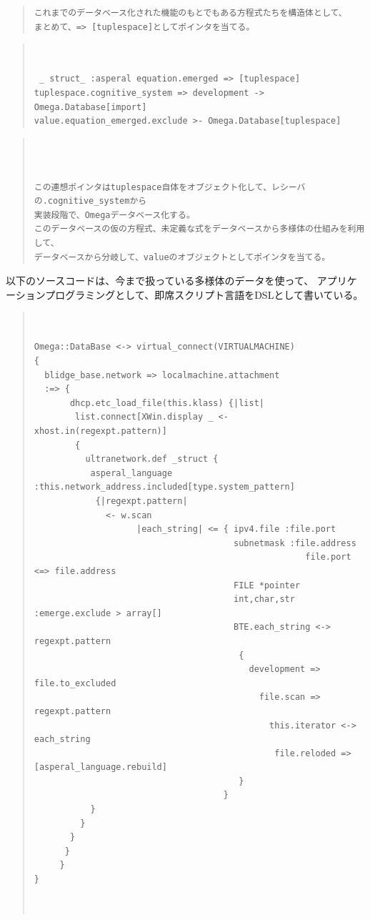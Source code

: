 \documentclass{jsarticle}
\begin{document}
{\begin{quote}
\begin{verbatim}
これまでのデータベース化された機能のもとでもある方程式たちを構造体として、
まとめて、=> [tuplespace]としてポインタを当てる。
\end{verbatim}
\end{quote}

\begin{quote}
\setlength{\baselineskip}{12pt}
\begin{verbatim}


 _ struct_ :asperal equation.emerged => [tuplespace]
tuplespace.cognitive_system => development -> Omega.Database[import]	
value.equation_emerged.exclude >- Omega.Database[tuplespace]
\end{verbatim}
\end{quote}

\begin{quote}
\setlength{\baselineskip}{12pt}
\begin{verbatim}



この連想ポインタはtuplespace自体をオブジェクト化して、レシーバの.cognitive_systemから
実装段階で、Omegaデータベース化する。
このデータベースの仮の方程式、未定義な式をデータベースから多様体の仕組みを利用して、
データベースから分岐して、valueのオブジェクトとしてポインタを当てる。

\end{verbatim}
\end{quote}


以下のソースコードは、今まで扱っている多様体のデータを使って、
アプリケーションプログラミングとして、即席スクリプト言語をDSLとして書いている。
\begin{quote}
\setlength{\baselineskip}{12pt}
\begin{verbatim}


Omega::DataBase <-> virtual_connect(VIRTUALMACHINE)
{
  blidge_base.network => localmachine.attachment
  :=> {
       dhcp.etc_load_file(this.klass) {|list|
        list.connect[XWin.display _ <- xhost.in(regexpt.pattern)]
        {
          ultranetwork.def _struct {
           asperal_language :this.network_address.included[type.system_pattern]
            {|regexpt.pattern|
              <- w.scan
                    |each_string| <= { ipv4.file :file.port
                                       subnetmask :file.address
                                                     file.port <=> file.address
                                       FILE *pointer                   
                                       int,char,str :emerge.exclude > array[]
                                       BTE.each_string <-> regexpt.pattern
                                        {
                                          development => file.to_excluded
                                            file.scan => regexpt.pattern
                                              this.iterator <-> each_string
                                               file.reloded => [asperal_language.rebuild]
                                        }        
                                     }
           }   
         }
       }
      }
     } 
}



\end{verbatim}
\end{quote}}
\end{document}
